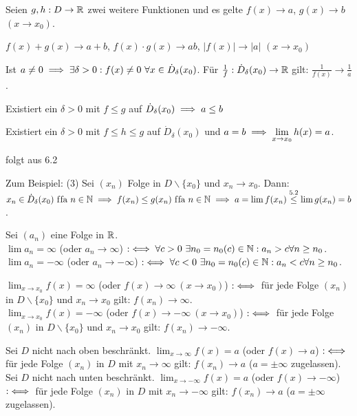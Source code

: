 \documentclass[a4paper,oneside,DIV15,BCOR12mm]{scrbook}
\begin{document}
\begin{satz}
Seien $g, h: D \to \mathbb{R}$ zwei weitere Funktionen und es gelte $f(x) \to a$, $g(x)\to b$ $(x\to x_0)$.
\begin{liste}
\item $f(x)+g(x) \to a+b$, $f(x)\cdot g(x) \to ab$, $|f(x)| \to |a|$ $(x\to x_0)$
\item Ist $a \ne 0 \implies \exists \delta>0: f(x)\ne 0 \ \forall x\in\dot D_\delta(x_0)$. Für $\frac{1}{f}: \dot D_\delta(x_0) \to \mathbb{R}$ gilt: $\frac{1}{f(x)} \to \frac{1}{a}$.
\item Existiert ein $\delta > 0 $ mit $f \le g$ auf $\dot D_\delta(x_0) \implies a \le b$
\item Existiert ein $\delta > 0$ mit $f \le h \le g$ auf $\dot D_\delta(x_0)$ und $a = b \implies \displaystyle\lim_{x\to x_0} h(x) = a$.
\end{liste}
\end{satz}

\begin{beweis}
folgt aus 6.2

Zum Beispiel: (3) Sei $(x_n)$ Folge in $D\backslash\{x_0\}$ und $x_n \to x_0$. Dann: $x_n \in \dot D_\delta(x_0) \text{ f\/fa } n\in\mathbb{N} \implies f(x_n) \le g(x_n) \text{ f\/fa } n\in\mathbb{N} \implies a = \lim f(x_n) \stackrel{\text{5.2}}{\le} \lim g(x_n) = b$.
\end{beweis}

\begin{definition}
\begin{liste}
\item Sei $(a_n)$ eine Folge in $\mathbb{R}$.\\
$\lim a_n = \infty$ (oder $a_n \to \infty$) $:\iff \forall c>0 \ \exists n_0 = n_0(c)\in\mathbb{N}: a_n > c \forall n\ge n_0$.\\ 
$\lim a_n = -\infty$ (oder $a_n \to -\infty$) $:\iff \forall c<0 \ \exists n_0 = n_0(c)\in\mathbb{N}: a_n < c \forall n\ge n_0$. 
\item $\displaystyle\lim_{x\to x_0} f(x) = \infty$ (oder $f(x) \to \infty\ (x\to x_0)$) $:\iff$ für jede Folge $(x_n)$ in $D\backslash\{x_0\}$  und $x_n \to x_0$ gilt: $f(x_n) \to \infty$. \\
$\displaystyle\lim_{x\to x_0} f(x) = -\infty$ (oder $f(x) \to -\infty\ (x\to x_0)$) $:\iff$ für jede Folge $(x_n)$ in $D\backslash\{x_0\}$  und $x_n \to x_0$ gilt: $f(x_n) \to -\infty$.
\item Sei $D$ nicht nach oben beschränkt. $\displaystyle\lim_{x\to \infty} f(x) = a$ (oder $f(x) \to a$) $:\iff$ für jede Folge $(x_n)$ in $D$ mit $x_n\to \infty$ gilt: $f(x_n) \to a$ ($a = \pm\infty$ zugelassen). \\
Sei $D$ nicht nach unten beschränkt. $\displaystyle\lim_{x\to -\infty} f(x) = a$ (oder $f(x) \to -\infty$) $:\iff$ für jede Folge $(x_n)$ in $D$ mit $x_n\to -\infty$ gilt: $f(x_n) \to a$ ($a = \pm\infty$ zugelassen). \\
\end{liste}
\end{definition}
\end{document}
